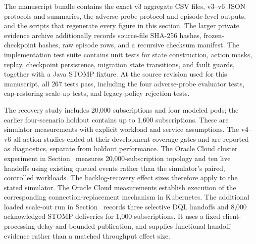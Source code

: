 The manuscript bundle contains the exact v3 aggregate CSV files, v3--v6 JSON
protocols and summaries, the adverse-probe protocol and episode-level outputs,
and the scripts that regenerate every figure in this section. The
larger private evidence archive additionally records source-file SHA-256 hashes,
frozen-checkpoint hashes, raw episode rows, and a recursive checksum manifest.
The implementation test suite contains unit tests for state construction,
action masks, replay, checkpoint persistence, migration state transitions, and
fault guards, together with a Java STOMP fixture. At the source revision used
for this manuscript, all 267 tests pass, including the four adverse-probe
evaluator tests, cap-restoring scale-up tests, and legacy-policy rejection
tests.

The recovery study includes 20,000 subscriptions and four modeled pods;
the earlier four-scenario holdout contains up to 1,600 subscriptions. These
are simulator measurements with explicit workload and service assumptions.
The v4--v6 all-action studies ended at their development coverage gates and
are reported as diagnostics, separate from holdout performance. The Oracle
Cloud cluster experiment in Section~ measures
20,000-subscription topology and ten live handoffs using existing queued
events rather than the simulator's paired, controlled workloads. The
backlog-recovery effect sizes therefore apply to the stated simulator. The
Oracle Cloud measurements establish execution of the corresponding
connection-replacement mechanism in Kubernetes.
The additional loaded scale-out run in Section~
records three selective DQL handoffs and 8,000 acknowledged STOMP deliveries
for 1,000 subscriptions. It uses a fixed client-processing delay and bounded
publication, and supplies functional handoff evidence rather than a matched
throughput effect size.


